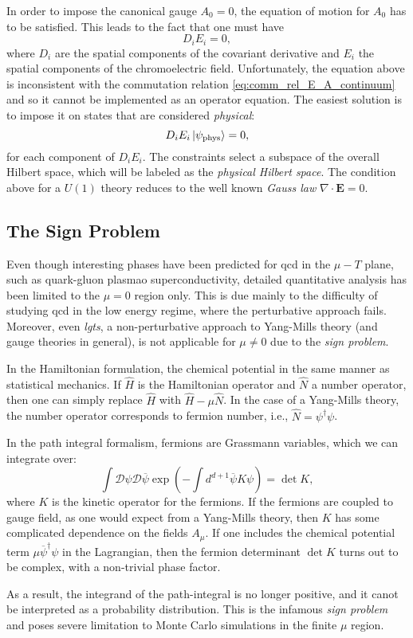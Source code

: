 In order to impose the canonical gauge $A_0 = 0$, the equation of motion for $A_0$ has to be satisfied.
This leads \citneeded to the fact that one must have
\begin{equation}
    D_i E_i = 0,
\end{equation}
where $D_i$ are the spatial components of the covariant derivative and $E_i$ the spatial components of the chromoelectric field.
Unfortunately, the equation above is inconsistent with the commutation relation \eqref{eq:comm_rel_E_A_continuum} and so it cannot be implemented as an operator equation.
The easiest solution is to impose it on states that are considered \emph{physical}:
\begin{equation}
    D_i E_i \ket{\psi_{\text{phys}}} = 0,
\end{equation}
for each component of $D_i E_i$.
The constraints select a subspace of the overall Hilbert space, which will be labeled as the \emph{physical Hilbert space}.
The condition above for a $U(1)$ theory reduces to the well known \emph{Gauss law} $\nabla \cdot \mathbf{E} = 0$.


\subsection{The Sign Problem}
\label{sub:the_sign_problem}

Even though interesting phases have been predicted for \ac{qcd} in the $\mu - T$ plane\citneeded, such as quark-gluon plasma\citneeded o superconductivity\citneeded, detailed quantitative analysis has been limited to the $\mu = 0$ region only.
This is due mainly to the difficulty of studying \ac{qcd} in the low energy regime, where the perturbative approach fails\citneeded.
Moreover, even \emph{\ac{lgt}s}, a non-perturbative approach to Yang-Mills theory (and gauge theories in general), is not applicable for $\mu \neq 0$ due to the \emph{sign problem}.

In the Hamiltonian formulation, the chemical potential in the same manner as statistical mechanics.
If $\hat{H}$ is the Hamiltonian operator and $\hat{N}$ a number operator, then one can simply replace $\hat{H}$ with $\hat{H} - \mu \hat{N}$.
In the case of a Yang-Mills theory, the number operator corresponds to fermion number, i.e., $\hat{N} = \psi^{\dagger} \psi$.

In the path integral formalism, fermions are Grassmann variables, which we can integrate over:
\begin{equation}
    \int \mathcal{D} \psi \mathcal{D} \overline{\psi} \exp(-\int d^{d+1} \overline{\psi} K \psi) = \det K,
\end{equation}
where $K$ is the kinetic operator for the fermions.
If the fermions are coupled to gauge field, as one would expect from a Yang-Mills theory, then $K$ has some complicated dependence on the fields $A_{\mu}$.
If one includes the chemical potential term $\mu \overline{\psi}^{\dagger} \psi$ in the Lagrangian, then the fermion determinant $\det K$ turns out to be complex\citneeded, with a non-trivial phase factor.

As a result, the integrand of the path-integral is no longer positive, and it canot be interpreted as a probability distribution.
This is the infamous \emph{sign problem} and poses severe limitation to Monte Carlo simulations in the finite $\mu$ region.
